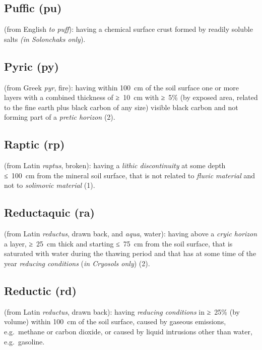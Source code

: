 \documentclass[
  letterpaper,
  DIV=11,
  numbers=noendperiod]{scrreprt}
\begin{document}
\hypertarget{puffic-pu}{%
\subsection{Puffic (pu)}\label{puffic-pu}}

(from English \emph{to puff}): having a chemical surface crust formed by
readily soluble salts \emph{(in Solonchaks only}).

\hypertarget{pyric-py}{%
\subsection{Pyric (py)}\label{pyric-py}}

(from Greek \emph{pyr}, fire): having within 100~cm of the soil surface
one or more layers with a combined thickness of ≥~10~cm with ≥~5\% (by
exposed area, related to the fine earth plus black carbon of any size)
visible black carbon and not forming part of a \emph{pretic horizon}
(2).

\hypertarget{raptic-rp}{%
\subsection{Raptic (rp)}\label{raptic-rp}}

(from Latin \emph{raptus}, broken): having a \emph{lithic discontinuity}
at some depth ≤~100~cm from the mineral soil surface, that is not
related to \emph{fluvic material} and not to \emph{solimovic material}
(1).

\hypertarget{reductaquic-ra}{%
\subsection{Reductaquic (ra)}\label{reductaquic-ra}}

(from Latin \emph{reductus}, drawn back, and \emph{aqua}, water): having
above a \emph{cryic horizon} a layer, ≥~25~cm thick and starting ≤~75~cm
from the soil surface, that is saturated with water during the thawing
period and that has at some time of the year \emph{reducing conditions}
(\emph{in Cryosols only}) (2).

\hypertarget{reductic-rd}{%
\subsection{Reductic (rd)}\label{reductic-rd}}

(from Latin \emph{reductus}, drawn back): having \emph{reducing
conditions} in ≥~25\% (by volume) within 100~cm of the soil surface,
caused by gaseous emissions, e.g.~methane or carbon dioxide, or caused
by liquid intrusions other than water, e.g.~gasoline.
\end{document}

